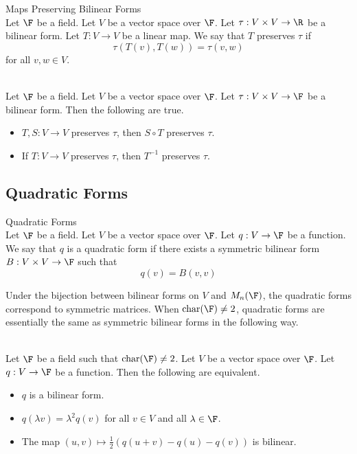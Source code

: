 \documentclass[a4paper]{article}
\begin{document}
\begin{defn}{Maps Preserving Bilinear Forms}{}\\
Let $\F$ be a field. Let $V$ be a vector space over $\F$. Let $\tau:V\times V\to\R$ be a bilinear form. Let $T:V\to V$ be a linear map. We say that $T$ preserves $\tau$ if $$\tau(T(v),T(w))=\tau(v,w)$$ for all $v,w\in V$. 
\end{defn}

\begin{lmm}{}{}\\
Let $\F$ be a field. Let $V$ be a vector space over $\F$. Let $\tau:V\times V\to\F$ be a bilinear form. Then the following are true. 
\begin{itemize}
\item $T,S:V\to V$ preserves $\tau$, then $S\circ T$ preserves $\tau$. 
\item If $T:V\to V$ preserves $\tau$, then $T^{-1}$ preserves $\tau$. 
\end{itemize}
\end{lmm}

\subsection{Quadratic Forms}
\begin{defn}{Quadratic Forms}{}\\
Let $\F$ be a field. Let $V$ be a vector space over $\F$. Let $q:V\to\F$ be a function. We say that $q$ is a quadratic form if there exists a symmetric bilinear form $B:V\times V\to\F$ such that $$q(v)=B(v,v)$$
\end{defn}

Under the bijection between bilinear forms on $V$ and $M_n(\F)$, the quadratic forms correspond to symmetric matrices. When $\text{char}(\F)\neq 2$, quadratic forms are essentially the same as symmetric bilinear forms in the following way. 

\begin{lmm}{}{}\\
Let $\F$ be a field such that $\text{char}(\F)\neq 2$. Let $V$ be a vector space over $\F$. Let $q:V\to\F$ be a function. Then the following are equivalent. 
\begin{itemize}
\item $q$ is a bilinear form. 
\item $q(\lambda v)=\lambda^2 q(v)$ for all $v\in V$ and all $\lambda\in\F$. 
\item The map $(u,v)\mapsto\frac{1}{2}\left(q(u+v)-q(u)-q(v)\right)$ is bilinear. 
\end{itemize}
\end{lmm}
\end{document}
